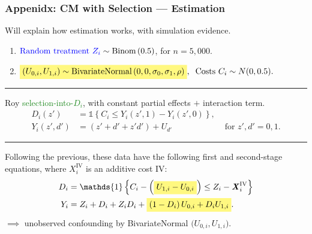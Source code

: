 \documentclass[dvipsnames]{beamer} %
\renewcommand{\vec}[1]{\boldsymbol{\mathit{#1}}}                           %
\newcommand{\indicator}[1]{\mathds{1}\left\{ #1 \right\}}                  %
\newcommand{\eqhighlight}[2]{\colorbox{#1!50}{$\displaystyle#2$}}
\begin{document}
\begin{frame}[noframenumbering]
    \frametitle{Appenidx: CM with Selection --- Estimation}
    Will explain how estimation works, with simulation evidence.
    \vskip0cm
    \begin{enumerate}
        \item $\text{\textcolor{blue}{Random treatment $Z_i$}}
            \sim \text{Binom}\left(0.5 \right)$, for $n = 5,000$.
        \item $ \eqhighlight{yellow}{
            \left( U_{0,i}, U_{1,i} \right) \sim
        \text{BivariateNormal}\left( 0, 0, \sigma_0, \sigma_1, \rho \right)},
            \;\; \text{Costs }C_i \sim N(0, 0.5). $
    \end{enumerate}
    \par\noindent\rule{\textwidth}{0.4pt}
    Roy \textcolor{ForestGreen}{selection-into-$D_i$}, with constant partial effects $+$ interaction term.
    \begin{align*}
        D_i(z')    &= \indicator{C_i \leq Y_i(z', 1) - Y_i(z', 0)},&  \\
        Y_i(z',d') &= \left( z' + d' + z' d' \right) + U_{d'}
        & \text{ for } z',d' = 0,1.
    \end{align*}
    \par\noindent\rule{\textwidth}{0.4pt}
    Following the previous, these data have the following first and second-stage equations, where $\vec X_i^\text{IV}$ is an additive cost IV:
    \begin{align*}
        D_i &= \indicator{
            C_i - \Big( \eqhighlight{yellow}{U_{1,i} - U_{0,i}} \Big)
                \leq Z_i - \vec X_i^{\text{IV}} } \\
        Y_i &= Z_i + D_i + Z_i D_i
            + \eqhighlight{yellow}{
                \left( 1 - D_i \right) U_{0,i} + D_i U_{1,i}}.
    \end{align*}
    \small
    $\implies$ unobserved confounding by BivariateNormal $\Big(U_{0,i}, U_{1,i}\Big)$.
\end{frame}
\end{document}
